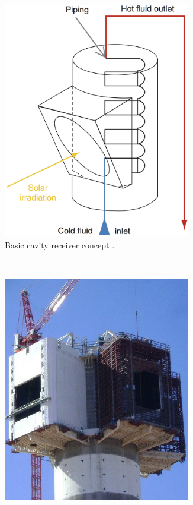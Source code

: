 \documentclass[Master,MEE,english]{twbook}%
\begin{document}
\begin{figure}[!htbp]
        \centering
        \begin{subfigure}[b]{0.5\textwidth}
                \centering
                \includegraphics[width=0.9\textwidth]{FIG/CavityReceiver}
                \caption{Basic cavity receiver concept \cite{Alexopoulos2013}.}\label{CavityReceiver}
        \end{subfigure}%
        ~
        \begin{subfigure}[b]{0.5\textwidth}
                \centering
                \includegraphics[width=0.9\textwidth]{FIG/KhiSolarOneReceiver}

\end{subfigure}
\end{figure}
\end{document}
